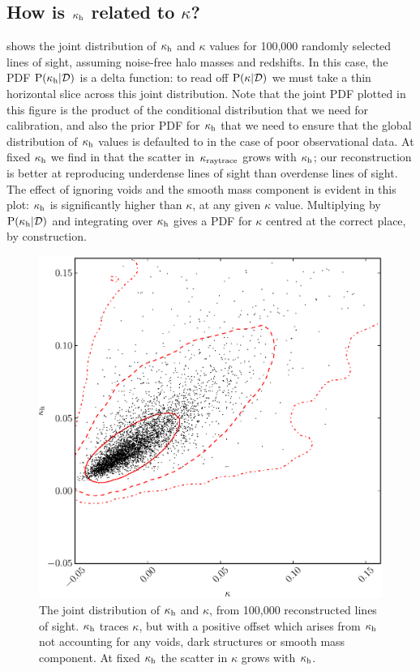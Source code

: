 \documentclass[useAMS,usenatbib]{mn2e}
\begin{document}

\subsection{How is $\kappa_{\rm h}$ related to $\kappa$?}

 shows the joint distribution of $\kappa_{\rm h}$ and $\kappa$
values for 100,000 randomly selected \MS lines of sight, assuming noise-free
halo masses and redshifts. In this case, the PDF ${\rm P}(\kappa_{\rm h}|{\mathcal{D}})$ is a
delta function: to read off ${\rm P}(\kappa|{\mathcal{D}})$ we must take a thin horizontal
slice across this joint distribution. Note that the joint PDF plotted in this
figure is the product of  the conditional distribution that we need for
calibration, and also the prior PDF for $\kappa_{\rm h}$ that we need to ensure that
the global distribution of $\kappa_{\rm h}$ values is defaulted to in the case of
poor observational data. At fixed $\kappa_{\rm h}$ we find in 
that the scatter in $\kappa_{\rm raytrace}$ grows with $\kappa_{\rm h}$; our reconstruction is
better at reproducing underdense lines of sight than overdense lines of sight.
The effect of ignoring voids and the smooth mass component is evident in this
plot: $\kappa_{\rm h}$ is significantly higher than $\kappa$, at any given $\kappa$
value. Multiplying by ${\rm P}(\kappa_{\rm h}|{\mathcal{D}})$ and integrating over $\kappa_{\rm h}$
gives a PDF for $\kappa$ centred at the correct place, by construction.

\begin{figure}
\includegraphics[width=\columnwidth]{figs/cornerplot.eps}
\caption[Biased?]{The joint distribution of 
$\kappa_{\rm h}$ and $\kappa$, from 100,000 reconstructed lines of
sight. $\kappa_{\rm h}$ traces $\kappa$, but with a positive offset which arises from
$\kappa_{\rm h}$ not accounting for any voids, dark structures or smooth mass
component. At fixed $\kappa_{\rm h}$ the scatter in $\kappa$ grows with $\kappa_{\rm h}$.}
\label{fig:jointkh-k}
\end{figure}
\end{document}
